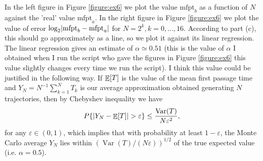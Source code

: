 \documentclass[a4paper,11pt]{article}
\theoremstyle{definition}
\theoremstyle{plain}
\theoremstyle{remark}
\DeclarePairedDelimiter{\abs}{\lvert}{\rvert}
\DeclarePairedDelimiter{\parq}{[}{]}
\DeclarePairedDelimiter{\bra}{\lbrace}{\rbrace}
\DeclareMathOperator*{\expval}{\mathbb{E}}
\DeclareMathOperator*{\varval}{\mathrm{Var}}
\begin{document}
In the left figure in Figure \ref{figure:ex6} we plot the value $\mathrm{mfpt}_b$ as a function of $N$ against the 'real' value $\mathrm{mfpt}_a$. In the right figure in Figure \ref{figure:ex6} we plot the value of error $\log_2\abs{\mathrm{mfpt}_b-\mathrm{mfpt}_a}$ for $N=2^k, k=0,\dots,16$. According to part (c), this should go approximately as a line, so we plot it against its linear regression. The linear regression gives an estimate of $\alpha\simeq 0.51$ (this is the value of $\alpha$ I obtained when I run the script who gave the figures in Figure \ref{figure:ex6} this value slightly changes every time we run the script). I think this value could be justified in the following way. If $\expval\parq{T}$ is the value of the mean first passage time and $Y_N = N^{-1}\sum_{k=1}^NT_k$ is our average approximation obtained generating $N$ trajectories, then by Chebyshev inequality we have
$$
P\bra{\abs{Y_N-\expval\parq{T}}>\varepsilon} \leq \frac{\varval(T)}{N\varepsilon^2},
$$
for any $\varepsilon\in(0,1)$, which implies that with probability at least $1-\varepsilon$, the Monte Carlo average $Y_N$ lies within
$(\varval(T)/(N\varepsilon))^{1/2}$ of the true expected value  (i.e. $\alpha=0.5$).
\end{document}
